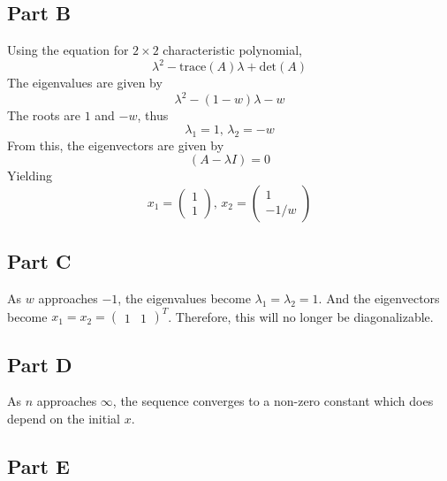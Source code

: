 \documentclass{article}
\begin{document}
\subsection*{Part B}

Using the equation for $2 \times 2$ characteristic polynomial,
$$ \lambda^2 - \mathrm{trace}(A) \lambda + \mathrm{det}(A) $$
The eigenvalues are given by
$$ \lambda^2 - (1 - w) \lambda - w $$
The roots are $1$ and $-w$, thus
$$ \lambda_1 = 1,\, \lambda_2 = -w $$
From this, the eigenvectors are given by
$$ (A - \lambda I) = 0 $$
Yielding
$$ x_1 = \begin{pmatrix}
  1 \\
  1
\end{pmatrix},\, x_2 = \begin{pmatrix}
  1 \\
  -1/w
\end{pmatrix} $$

\subsection*{Part C}

As $w$ approaches $-1$, the eigenvalues become $ \lambda_1 = \lambda_2 = 1 $.
And the eigenvectors become $ x_1 = x_2 = \begin{pmatrix} 1 & 1
\end{pmatrix}^T $. Therefore, this will no longer be diagonalizable.

\subsection*{Part D}

As $n$ approaches $\infty$, the sequence converges to a non-zero constant
which does depend on the initial $x$.

\subsection*{Part E}
\end{document}
